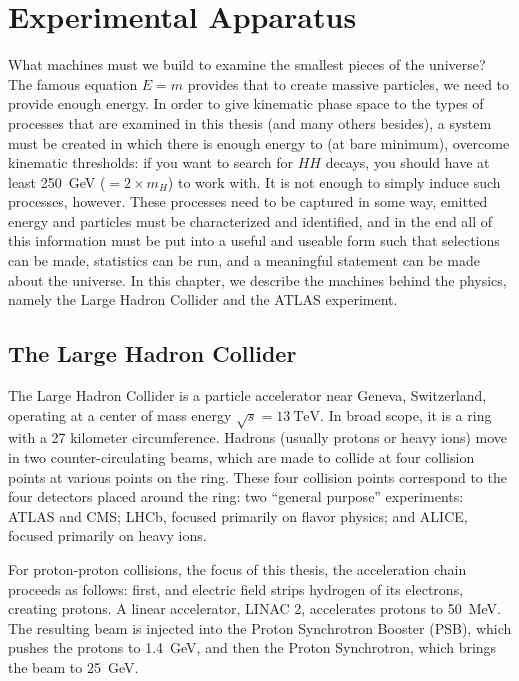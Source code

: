 \chapter{Experimental Apparatus}
\label{chap:experiment}

What machines must we build to examine the smallest pieces of the universe? The famous equation 
$E = m$ provides that to create massive particles, we need to provide enough energy. In order to give 
kinematic phase space to the types of processes that are examined in this thesis (and many others besides),
a system must be created in which there is enough energy to (at bare minimum), overcome kinematic thresholds:
if you want to search for $HH$ decays, you should have at least \SI{250}{\GeV} ($= 2\times m_{H}$) to work with.
It is not enough to simply induce such processes, however. These processes need to be captured in some way, emitted 
energy and particles must be characterized and identified, and in the end all of this information must be put into a 
useful and useable form such that selections can be made, statistics can be run, and a meaningful statement 
can be made about the universe. In this chapter, we describe the machines behind the physics, namely the Large 
Hadron Collider and the ATLAS experiment.

\section{The Large Hadron Collider}
The Large Hadron Collider is a particle accelerator near Geneva, Switzerland, 
operating at a center of mass energy $\sqrt{s} = \SI{13}{\TeV}$. In broad scope, it is a 
ring with a 27 kilometer circumference. Hadrons (usually protons or heavy ions) move in two 
counter-circulating beams, which are made to collide at four collision points at various 
points on the ring. These four collision points correspond to the four detectors placed 
around the ring: two ``general purpose'' experiments: ATLAS and CMS; LHCb, focused primarily 
on flavor physics; and ALICE, focused primarily on heavy ions.

For proton-proton collisions, the focus of this thesis, the acceleration chain proceeds as follows:
first, and electric field strips hydrogen of its electrons, creating protons. A linear accelerator,
LINAC 2, accelerates protons to \SI{50}{\MeV}. The resulting beam is injected into the Proton 
Synchrotron Booster (PSB), which pushes the protons to \SI{1.4}{\GeV}, and then the Proton Synchrotron,
which brings the beam to \SI{25}{\GeV}.

